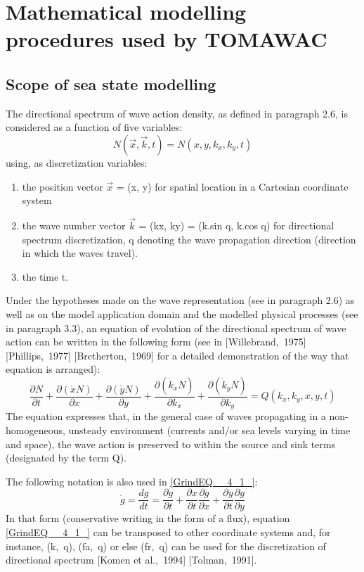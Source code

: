 
\chapter{  Mathematical modelling procedures used by TOMAWAC}

\section{ Scope of sea state modelling}

 The directional spectrum of wave action density, as defined in paragraph 2.6, is considered as a function of five variables:
\[N(\vec{x},\vec{k},t)=N(x,y,k_{x} ,k_{y} ,t)\]
using, as discretization variables:

 \begin{enumerate}
\item the position vector $\vec{x}$ = (x, y) for spatial location in a Cartesian coordinate system

 \item the wave number vector $\vec{k}$ = (kx, ky) = (k.sin q, k.cos q) for directional spectrum discretization, q denoting the wave propagation direction (direction in which the waves travel).

 \item the time t.
\end{enumerate}

Under the hypotheses made on the wave representation (see in paragraph 2.6) as well as on the model application domain and the modelled physical processes (see in paragraph 3.3), an equation of evolution of the directional spectrum of wave action can be written in the following form (see in [Willebrand,~1975] [Phillips,~1977] [Bretherton,~1969] for a detailed demonstration of the way that equation is arranged):
\begin{equation} \label{GrindEQ__4_1_}
\frac{\partial N}{\partial t} +\frac{\partial (\dot{x}N)}{\partial x} +\frac{\partial (\dot{y}N)}{\partial y} +\frac{\partial (\dot{k}_{x} N)}{\partial k_{x} } +\frac{\partial (\dot{k}_{y} N)}{\partial k_{y} } =Q(k_{x} ,k_{y} ,x,y,t)
\end{equation}
The equation expresses that, in the general case of waves propagating in a non-homogeneous, unsteady environment (currents and/or sea levels varying in time and space), the wave action is preserved to within the source and sink terms (designated by the term Q).

 The following notation is also used in \eqref{GrindEQ__4_1_}:
\[\dot{g}=\frac{dg}{dt} =\frac{\partial g}{\partial t} +\frac{\partial x}{\partial t} \frac{\partial g}{\partial x} +\frac{\partial y}{\partial t} \frac{\partial g}{\partial y} \]
In that form (conservative writing in the form of a flux), equation \eqref{GrindEQ__4_1_} can be transposed to other coordinate systems and, for instance, (k,~q), (fa,~q) or else (fr,~q) can be used for the discretization of directional spectrum [Komen et al.,~1994] [Tolman,~1991].

